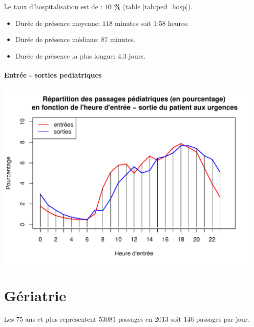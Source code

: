\documentclass[12pt,english,french,twoside]{book}\usepackage[]{graphicx}\usepackage[]{color}
\makeatletter
\def\maxwidth{ %
  \ifdim\Gin@nat@width>\linewidth
    \linewidth
  \else
    \Gin@nat@width
  \fi
}
\newenvironment{knitrout}{}{} %
\makeatother
\begin{document}
Le taux d'hospitalisation est de : \textbf{$10$ \%} (table \ref{tab:ped_hosp}).




\begin{itemize}
  \item Durée de présence moyenne: $118$ minutes soit 1:58 heures.
  \item Durée de présence médiane: $87$ minutes.
  \item Durée de présence la plus longue: $4.3$ jours.
\end{itemize}

\subsubsection*{Entrée - sorties pediatriques}

\begin{knitrout}
\color{fgcolor}
\includegraphics[width=\maxwidth]{figure/es_pediatriques-1} 

\end{knitrout}

\chapter{Gériatrie}


\label{chap_geriatrie}



Les 75 ans et plus représentent $53 081$ passages en 2013 soit $146$ passages par jour.
\end{document}

